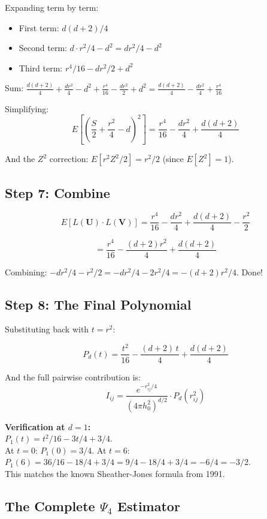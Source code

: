\documentclass[12pt]{article}
\newcommand{\note}[1]{\begin{tcolorbox}[colback=yellow!5,colframe=yellow!60!black,breakable]\small #1\end{tcolorbox}}
\begin{document}
\note{
Expanding term by term:
\begin{itemize}
\item First term: $d(d+2)/4$
\item Second term: $d \cdot r^2/4 - d^2 = dr^2/4 - d^2$
\item Third term: $r^4/16 - dr^2/2 + d^2$
\end{itemize}
Sum: $\frac{d(d+2)}{4} + \frac{dr^2}{4} - d^2 + \frac{r^4}{16} - \frac{dr^2}{2} + d^2 = \frac{d(d+2)}{4} - \frac{dr^2}{4} + \frac{r^4}{16}$
}

Simplifying:
$$E\left[\left(\frac{S}{2}+\frac{r^2}{4}-d\right)^2\right] = \frac{r^4}{16} - \frac{dr^2}{4} + \frac{d(d+2)}{4}$$

And the $Z^2$ correction: $E[r^2 Z^2/2] = r^2/2$ (since $E[Z^2]=1$).

\subsection{Step 7: Combine}

$$E[L(\mathbf{U})\cdot L(\mathbf{V})] = \frac{r^4}{16} - \frac{dr^2}{4} + \frac{d(d+2)}{4} - \frac{r^2}{2}$$

$$= \frac{r^4}{16} - \frac{(d+2)r^2}{4} + \frac{d(d+2)}{4}$$

\note{
Combining: $-dr^2/4 - r^2/2 = -dr^2/4 - 2r^2/4 = -(d+2)r^2/4$. Done!}

\subsection{Step 8: The Final Polynomial}

Substituting back with $t = r^2$:

$$\boxed{P_d(t) = \frac{t^2}{16} - \frac{(d+2)\,t}{4} + \frac{d(d+2)}{4}}$$

And the full pairwise contribution is:
$$I_{ij} = \frac{e^{-r_{ij}^2/4}}{(4\pi h_0^2)^{d/2}} \cdot P_d(r_{ij}^2)$$

\note{
\textbf{Verification at $d=1$:}\\
$P_1(t) = t^2/16 - 3t/4 + 3/4$.\\
At $t=0$: $P_1(0) = 3/4$. At $t=6$: $P_1(6) = 36/16 - 18/4 + 3/4 = 9/4 - 18/4 + 3/4 = -6/4 = -3/2$.\\
This matches the known Sheather-Jones formula from 1991. \checkmark
}

\subsection{The Complete $\Psi_4$ Estimator}
\end{document}
